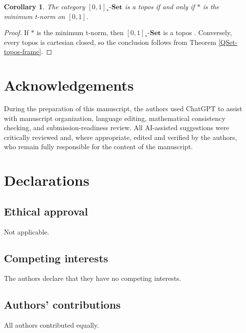 \documentclass{birkau}
\theoremstyle{plain}
\newtheorem{cor}[thm]{Corollary}
\theoremstyle{definition}
\newcommand{\Set}{\mathbf{Set}}
\newcommand{\RSet}{[0,1]_*\text{-}\Set}
\numberwithin{equation}{section}
\begin{document}
\begin{cor}
The category $\RSet$ is a topos if and only if $*$ is the minimum t-norm on $[0,1]$.
\end{cor}

\begin{proof}
If $*$ is the minimum t-norm, then $\RSet$ is a topos \cite{Hoehle1992}. Conversely, every topos is cartesian closed, so the conclusion follows from Theorem \ref{QSet-topos-frame}.
\end{proof}



\section*{Acknowledgements}

During the preparation of this manuscript, the authors used ChatGPT to assist with manuscript organization, language editing, mathematical consistency checking, and submission-readiness review. All AI-assisted suggestions were critically reviewed and, where appropriate, edited and verified by the authors, who remain fully responsible for the content of the manuscript.

\section*{Declarations}

\subsection*{Ethical approval}
Not applicable.

\subsection*{Competing interests}
The authors declare that they have no competing interests.

\subsection*{Authors' contributions}
All authors contributed equally.
\end{document}
